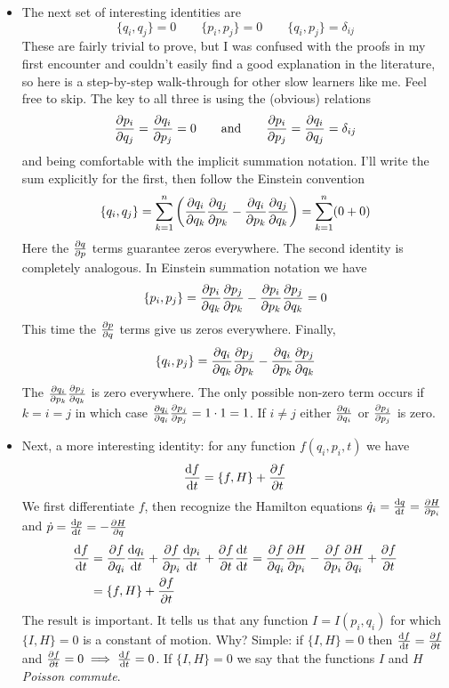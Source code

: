 \documentclass[11pt, a4paper]{article}
\newcommand{\eqtext}[1]{\qquad \text{#1} \qquad}
\begin{document}
\begin{itemize}
	\item The next set of interesting identities are
	\begin{equation*}
		\{q_{i}, q_{j}\} = 0 \qquad \{p_{i}, p_{j}\} = 0 \qquad \{q_{i}, p_{j}\} = \delta_{ij}
	\end{equation*}
	These are fairly trivial to prove, but I was confused with the proofs in my first encounter and couldn't easily find a good explanation in the literature, so here is a step-by-step walk-through for other slow learners like me. Feel free to skip. The key to all three is using the (obvious) relations
	\begin{equation*}
		\pdv{p_{i}}{q_{j}} = \pdv{q_{i}}{p_{j}} = 0  \eqtext{and} \pdv{p_{i}}{p_{j}} = \pdv{q_{i}}{q_{j}} = \delta_{i j} 
	\end{equation*}
	and being comfortable with the implicit summation notation. I'll write the sum explicitly for the first, then follow the Einstein convention
	\begin{equation*}
		\{q_{i}, q_{j}\} = \sum_{k=1}^{n} \left(\pdv{q_{i}}{q_{k}} \pdv{q_{j}}{p_{k}} - \pdv{q_{i}}{p_{k}} \pdv{q_{j}}{q_{k}}\right) = \sum_{k=1}^{n} (0 + 0)
	\end{equation*}
	Here the $ \pdv{q}{p} $ terms guarantee zeros everywhere. The second identity is completely analogous. In Einstein summation notation we have
	\begin{equation*}
		\{p_{i}, p_{j}\} = \pdv{p_{i}}{q_{k}} \pdv{p_{j}}{p_{k}} - \pdv{p_{i}}{p_{k}} \pdv{p_{j}}{q_{k}} = 0
	\end{equation*}
	This time the $ \pdv{p}{q} $ terms give us zeros everywhere. Finally,
	\begin{equation*}
		\{q_{i}, p_{j}\} = \pdv{q_{i}}{q_{k}} \pdv{p_{j}}{p_{k}} - \pdv{q_{i}}{p_{k}}\pdv{p_{j}}{q_{k}}
	\end{equation*}
	The $ \pdv{q_{i}}{p_{k}}\pdv{p_{j}}{q_{k}} $ is zero everywhere. The only possible non-zero term occurs if $ k = i = j $ in which case $ \pdv{q_{i}}{q_{i}} \pdv{p_{j}}{p_{j}} = 1\cdot 1 = 1$. If $ i \neq j $ either $ \pdv{q_{i}}{q_{i}} $ or $ \pdv{p_{j}}{p_{j}} $ is zero. 
	
	\item Next, a more interesting identity: for any function $ f(q_{i}, p_{i}, t) $ we have
	\begin{equation*}
		\dv{f}{t} = \{f, H\} + \pdv{f}{t} 
	\end{equation*}
	We first differentiate $ f $, then recognize the Hamilton equations $ \dot{q}_{i} = \dv{q}{t} = \pdv{H}{p_{i}} $ and $ \dot{p} = \dv{p}{t} = -\pdv{H}{q} $
	\begin{align*}
		\dv{f}{t} &= \pdv{f}{q_{i}}\dv{q_{i}}{t} + \pdv{f}{p_{i}} \dv{p_{i}}{t} + \pdv{f}{t} \dv{t}{t} = \pdv{f}{q_{i}} \pdv{H}{p_{i}} - \pdv{f}{p_{i}} \pdv{H}{q_{i}} + \pdv{f}{t}\\
		&=\{f, H\} + \pdv{f}{t}
	\end{align*}
	The result is important. It tells us that any function $ I = I(p_{i}, q_{i}) $ for which $ \{I, H\} = 0 $ is a constant of motion. Why? Simple: if $ \{I, H\} = 0 $ then $ \dv{f}{t} = \pdv{f}{t} $ and $ \pdv{f}{t} = 0 \implies \dv{f}{t} = 0 $. If $ \{I, H\} = 0 $ we say that the functions $ I $ and $ H $ \textit{Poisson commute}. 
	

\end{itemize}
\end{document}
